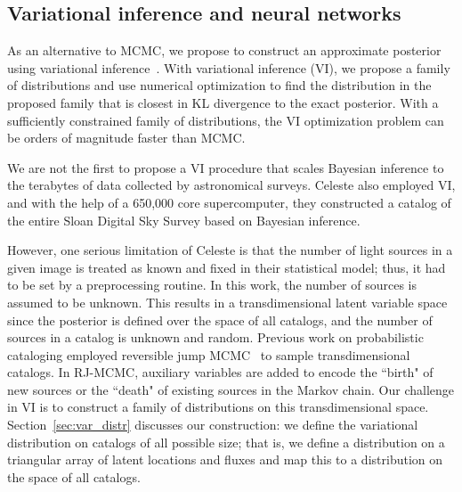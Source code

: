 \subsection{Variational inference and neural networks}
As an alternative to MCMC, we propose to construct an approximate posterior using variational inference~\cite{Blei_2017_vi_review,Jordan_intro_vi, Wainwrite_graph_models_vi}.
With variational inference (VI), we propose a family of distributions and use numerical optimization to find the distribution 
in the proposed family that is closest 
in KL divergence to the exact posterior. 
With a sufficiently constrained family of distributions, the VI optimization problem can be orders of magnitude faster than MCMC. 

We are not the first to propose a VI procedure
that scales Bayesian inference to the terabytes of data collected by astronomical surveys. 
Celeste \cite{regier2019_celeste} also employed 
VI, and with the help of a 650,000 core supercomputer, they constructed a catalog of the entire Sloan Digital Sky Survey based on Bayesian inference. 

However, one serious limitation of Celeste is that the number of light sources in a given image is treated as known and fixed in their statistical model; thus, it had to be set by a preprocessing routine. In this work, the number of sources is assumed to be unknown. This results in a transdimensional latent variable space since 
the posterior is defined over the space of all catalogs, and the number of sources in a catalog is unknown and random.
Previous work on probabilistic cataloging employed reversible jump MCMC~\cite{Green95reversiblejump} to sample transdimensional catalogs. In RJ-MCMC, auxiliary variables are added to encode the ``birth" of new sources 
or the ``death" of existing sources in the Markov chain. Our challenge in VI is to construct a family of distributions on this transdimensional space. Section~\ref{sec:var_distr} discusses our construction: we define the variational distribution on catalogs of all possible size; that is, we define a distribution on a triangular array of latent locations and fluxes and map this to a distribution 
on the space of all catalogs.

